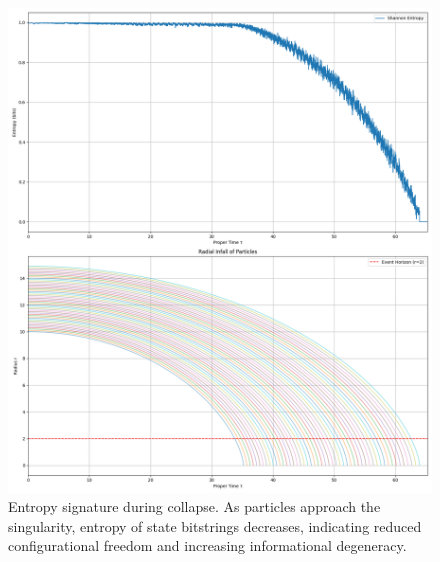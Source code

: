 \documentclass[11pt]{article}
\begin{document}
\begin{figure}[h!]
  \centering
  \includegraphics[width=\textwidth]{figures/schwarzschild_entropy_signature.png}
  \caption{Entropy signature during collapse. As particles approach the singularity, entropy of state bitstrings decreases, indicating reduced configurational freedom and increasing informational degeneracy.}
  \label{fig:schwarzschild_entropy}
\end{figure}
\end{document}
